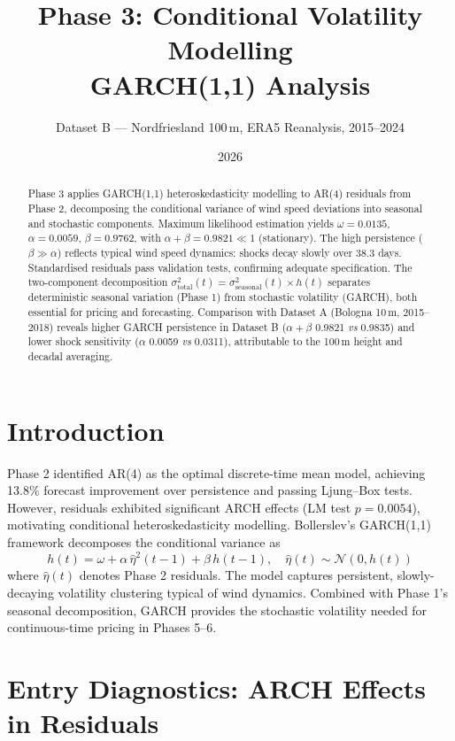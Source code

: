 \documentclass[11pt, a4paper, twoside]{article}
\title{\textbf{Phase 3: Conditional Volatility Modelling \\ GARCH(1,1) Analysis}}
\author{Dataset B --- Nordfriesland 100\,m, ERA5 Reanalysis, 2015--2024}
\date{2026}
\begin{document}
\maketitle

\begin{abstract}
Phase 3 applies GARCH(1,1) heteroskedasticity modelling to AR(4) residuals from Phase 2, decomposing the conditional variance of wind speed deviations into seasonal and stochastic components. Maximum likelihood estimation yields $ \omega = 0.0135 $, $ \alpha = 0.0059 $, $ \beta = 0.9762 $, with $ \alpha + \beta = 0.9821 \ll 1 $ (stationary). The high persistence ($\beta \gg \alpha$) reflects typical wind speed dynamics: shocks decay slowly over 38.3 days. Standardised residuals pass validation tests, confirming adequate specification. The two-component decomposition $ \sigma^2_{\text{total}}(t) = \sigma^2_{\text{seasonal}}(t) \times h(t) $ separates deterministic seasonal variation (Phase 1) from stochastic volatility (GARCH), both essential for pricing and forecasting. Comparison with Dataset A (Bologna 10\,m, 2015--2018) reveals higher GARCH persistence in Dataset B ($\alpha+\beta$ 0.9821 \textit{vs} 0.9835) and lower shock sensitivity ($\alpha$ 0.0059 \textit{vs} 0.0311), attributable to the 100\,m height and decadal averaging.
\end{abstract}

\section{Introduction}

Phase 2 identified AR(4) as the optimal discrete-time mean model, achieving 13.8\% forecast improvement over persistence and passing Ljung--Box tests. However, residuals exhibited significant ARCH effects (LM test $p = 0.0054$), motivating conditional heteroskedasticity modelling. Bollerslev's GARCH(1,1) framework \citep{Bollerslev:1986} decomposes the conditional variance as
\begin{equation}
h(t) = \omega + \alpha \, \hat{\eta}^2(t-1) + \beta \, h(t-1), \quad \hat{\eta}(t) \sim \mathcal{N}(0, h(t))
\end{equation}
where $\hat{\eta}(t)$ denotes Phase 2 residuals. The model captures persistent, slowly-decaying volatility clustering typical of wind dynamics. Combined with Phase 1's seasonal decomposition, GARCH provides the stochastic volatility needed for continuous-time pricing in Phases 5--6.

\section{Entry Diagnostics: ARCH Effects in Residuals}
\end{document}
